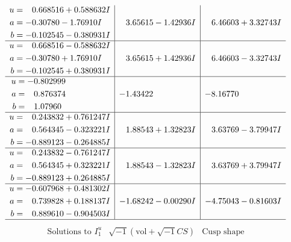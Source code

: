 \documentclass[1p]{elsarticle_modified}
\theoremstyle{definition}
\newcommand{\I}{\sqrt{-1}}
\begin{document}
$$\begin{array}{c|c|c}
\begin{aligned}
u &= \phantom{-}0.668516 + 0.588632 I \\
a &= -0.30780 - 1.76910 I \\
b &= -0.102545 - 0.380931 I\end{aligned}
 & \phantom{-}3.65615 - 1.42936 I & \phantom{-}6.46603 + 3.32743 I \\ \hline\begin{aligned}
u &= \phantom{-}0.668516 - 0.588632 I \\
a &= -0.30780 + 1.76910 I \\
b &= -0.102545 + 0.380931 I\end{aligned}
 & \phantom{-}3.65615 + 1.42936 I & \phantom{-}6.46603 - 3.32743 I \\ \hline\begin{aligned}
u &= -0.802999\phantom{ +0.000000I} \\
a &= \phantom{-}0.876374\phantom{ +0.000000I} \\
b &= \phantom{-}1.07960\phantom{ +0.000000I}\end{aligned}
 & -1.43422\phantom{ +0.000000I} & -8.16770\phantom{ +0.000000I} \\ \hline\begin{aligned}
u &= \phantom{-}0.243832 + 0.761247 I \\
a &= \phantom{-}0.564345 - 0.323221 I \\
b &= -0.889123 - 0.264885 I\end{aligned}
 & \phantom{-}1.88543 + 1.32823 I & \phantom{-}3.63769 - 3.79947 I \\ \hline\begin{aligned}
u &= \phantom{-}0.243832 - 0.761247 I \\
a &= \phantom{-}0.564345 + 0.323221 I \\
b &= -0.889123 + 0.264885 I\end{aligned}
 & \phantom{-}1.88543 - 1.32823 I & \phantom{-}3.63769 + 3.79947 I \\ \hline\begin{aligned}
u &= -0.607968 + 0.481302 I \\
a &= \phantom{-}0.739828 + 0.188137 I \\
b &= \phantom{-}0.889610 - 0.904503 I\end{aligned}
 & -1.68242 - 0.00290 I & -4.75043 - 0.81603 I\\
 \hline 
 \end{array}$$\newpage$$\begin{array}{c|c|c}  
\text{Solutions to }I^u_{1}& \I (\text{vol} + \sqrt{-1}CS) & \text{Cusp shape}\\

\end{array}$$
\end{document}
